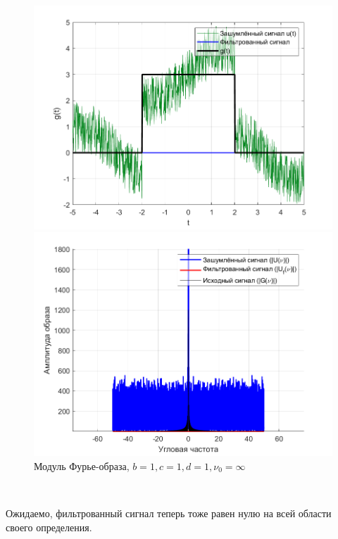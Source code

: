\documentclass[a4paper]{article}
\begin{document}
\begin{figure}[H]
    \begin{minipage}{0.5\textwidth}
        \centering
        \includegraphics[width=\textwidth]{part3/1_1_1_inf.png}
        \caption{$b = 1, c = 1, d = 1, \nu_0 = \infty$}
    \end{minipage}    
    \begin{minipage}{0.5\textwidth}
        \centering
        \includegraphics[width=\textwidth]{part3/1_1_1_Fourier_inf.png}
        \caption{Модуль Фурье-образа, $b = 1, c = 1, d = 1, \nu_0 = \infty$}
    \end{minipage}
\end{figure}\

Ожидаемо, фильтрованный сигнал теперь тоже равен нулю на всей области своего определения.
\end{document}
